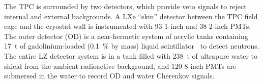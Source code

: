 The TPC is surrounded by two detectors, which provide veto signals to reject internal and external backgrounds. A LXe ``skin'' detector between the TPC field cage and the cryostat wall is instrumented with 93 1{\nobreakdash-}inch and 38 2{\nobreakdash-}inch PMTs.  The outer detector (OD) is a near-hermetic system of acrylic tanks containing \SI{17}{t} of gadolinium-loaded (\SI{0.1}{\percent} by mass) liquid scintillator~\cite{Haselschwardt:2018vmp} to detect neutrons. The entire LZ detector system is in a tank filled with \SI{238}{t} of ultrapure water to shield from the ambient radioactive background, and 120 8-inch PMTs are submersed in the water to record OD and water Cherenkov signals.
